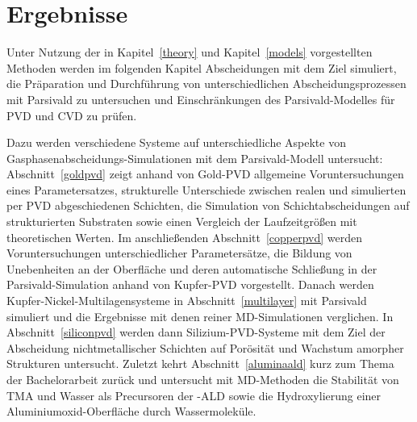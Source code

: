 \chapter{Ergebnisse}
\label{results}

Unter Nutzung der in Kapitel~\ref{theory} und Kapitel~\ref{models} vorgestellten Methoden werden im folgenden Kapitel Abscheidungen mit dem Ziel simuliert, die Präparation und Durchführung von unterschiedlichen Abscheidungsprozessen mit Parsivald zu untersuchen und Einschränkungen des Parsivald-Modelles für PVD und CVD zu prüfen.

Dazu werden verschiedene Systeme auf unterschiedliche Aspekte von Gas\-phasen\-abschei\-dungs-Simu\-la\-tionen mit dem Parsivald-Modell untersucht:
Abschnitt~\ref{goldpvd} zeigt anhand von Gold-PVD allgemeine Voruntersuchungen eines Parametersatzes, strukturelle Unterschiede zwischen realen und simulierten per PVD abgeschiedenen Schichten, die Simulation von Schichtabscheidungen auf strukturierten Substraten sowie einen Vergleich der Laufzeitgrößen mit theoretischen Werten.
Im anschließenden Abschnitt~\ref{copperpvd} werden Voruntersuchungen unterschiedlicher Parametersätze, die Bildung von Unebenheiten an der Oberfläche und deren automatische Schließung in der Parsivald-Simulation anhand von Kupfer-PVD vorgestellt.
Danach werden Kupfer-Nickel-Multi\-lagen\-systeme in Abschnitt~\ref{multilayer} mit Parsivald simuliert und die Ergebnisse mit denen reiner MD-Simulationen verglichen.
In Abschnitt~\ref{siliconpvd} werden dann Silizium-PVD-Systeme mit dem Ziel der Abscheidung nichtmetallischer Schichten auf Porösität und Wachstum amorpher Strukturen untersucht.
Zuletzt kehrt Abschnitt~\ref{aluminaald} kurz zum Thema der Bachelorarbeit zurück und untersucht mit MD-Methoden die Stabilität von TMA und Wasser als Precursoren der -ALD sowie die Hydroxylierung einer Aluminiumoxid-Oberfläche durch Wassermoleküle.

\clearpage

